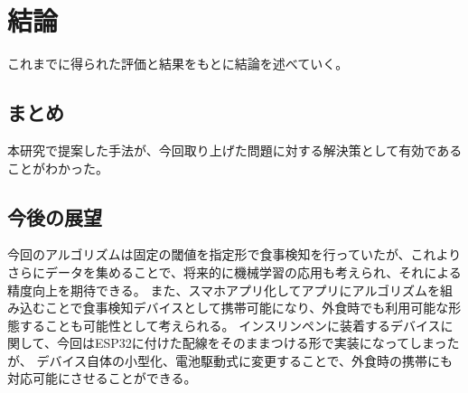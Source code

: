 \chapter{結論}
\label{chap:conclusion}

これまでに得られた評価と結果をもとに結論を述べていく。

\section{まとめ}
\label{section:conclusion_sum}

本研究で提案した手法が、今回取り上げた問題に対する解決策として有効であることがわかった。


\section{今後の展望}

今回のアルゴリズムは固定の閾値を指定形で食事検知を行っていたが、これよりさらにデータを集めることで、将来的に機械学習の応用も考えられ、それによる精度向上を期待できる。
また、スマホアプリ化してアプリにアルゴリズムを組み込むことで食事検知デバイスとして携帯可能になり、外食時でも利用可能な形態することも可能性として考えられる。
インスリンペンに装着するデバイスに関して、今回はESP32に付けた配線をそのままつける形で実装になってしまったが、
デバイス自体の小型化、電池駆動式に変更することで、外食時の携帯にも対応可能にさせることができる。
